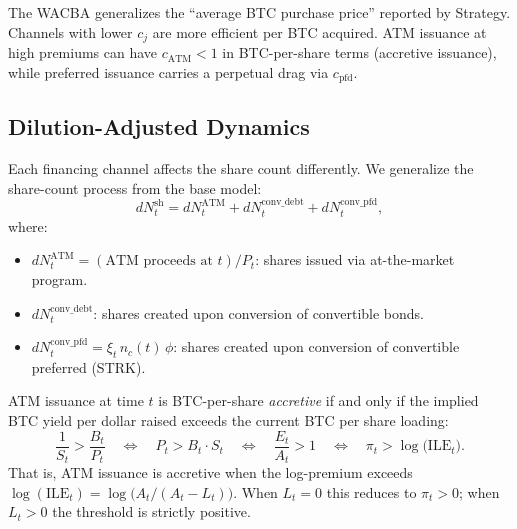 \begin{remark}
The WACBA generalizes the ``average BTC purchase price'' reported by
Strategy.  Channels with lower $c_j$ are more efficient per BTC acquired.
ATM issuance at high premiums can have $c_{\mathrm{ATM}} < 1$ in
BTC-per-share terms (accretive issuance), while preferred issuance carries
a perpetual drag via $c_{\mathrm{pfd}}$.
\end{remark}

\subsection{Dilution-Adjusted Dynamics}\label{subsec:dilution_adj}

Each financing channel affects the share count differently.  We generalize
the share-count process from the base model:
\begin{equation}\label{eq:dN_extended}
  dN_t^{\mathrm{sh}}
  = dN_t^{\mathrm{ATM}} + dN_t^{\mathrm{conv\_debt}} + dN_t^{\mathrm{conv\_pfd}},
\end{equation}
where:
\begin{itemize}
  \item $dN_t^{\mathrm{ATM}} = (\text{ATM proceeds at }t) / P_t$: shares
        issued via at-the-market program.
  \item $dN_t^{\mathrm{conv\_debt}}$: shares created upon conversion of
        convertible bonds.
  \item $dN_t^{\mathrm{conv\_pfd}} = \xi_t\, n_c(t)\, \phi$: shares created
        upon conversion of convertible preferred (STRK).
\end{itemize}

\begin{proposition}\label{prop:accretion}
ATM issuance at time $t$ is BTC-per-share \emph{accretive} if and only if
the implied BTC yield per dollar raised exceeds the current BTC per share
loading:
\begin{equation}\label{eq:accretive}
  \frac{1}{S_t} > \frac{B_t}{P_t}
  \quad\Longleftrightarrow\quad
  P_t > B_t \cdot S_t
  \quad\Longleftrightarrow\quad
  \frac{E_t}{A_t} > 1
  \quad\Longleftrightarrow\quad
  \pi_t > \log\!\bigl(\mathrm{ILE}_t\bigr).
\end{equation}
That is, ATM issuance is accretive when the log-premium exceeds
$\log(\mathrm{ILE}_t) = \log\!\bigl(A_t / (A_t - L_t)\bigr)$.
When $L_t = 0$ this reduces to $\pi_t > 0$; when $L_t > 0$ the
threshold is strictly positive.
\end{proposition}

